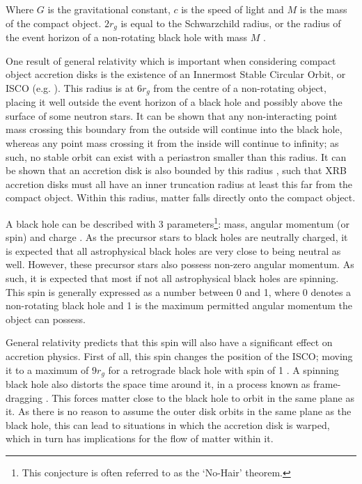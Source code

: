 Where $G$ is the gravitational constant, $c$ is the speed of light and $M$ is the mass of the compact object.  $2r_g$ is equal to the Schwarzchild radius, or the radius of the event horizon of a non-rotating black hole with mass $M$ \citep{Schwarzschild}.
\par One result of general relativity which is important when considering compact object accretion disks is the existence of an Innermost Stable Circular Orbit, or ISCO (e.g. \citealp{Misner_GravBook}).  This radius is at $6r_g$ from the centre of a non-rotating object, placing it well outside the event horizon of a black hole and possibly above the surface of some neutron stars.  It can be shown that any non-interacting point mass crossing this boundary from the outside will continue into the black hole, whereas any point mass crossing it from the inside will continue to infinity; as such, no stable orbit can exist with a periastron smaller than this radius. It can be shown that an accretion disk is also bounded by this radius \citep{Kozlowski_ISCO}, such that XRB accretion disks must all have an inner truncation radius at least this far from the compact object.  Within this radius, matter falls directly onto the compact object.
\par A black hole can be described with 3 parameters\footnote{This conjecture is often referred to as the `No-Hair' theorem.}: mass, angular momentum (or spin) and charge \citep{Israel_Bald}.  As the precursor stars to black holes are neutrally charged, it is expected that all astrophysical black holes are very close to being neutral as well.  However, these precursor stars also possess non-zero angular momentum.  As such, it is expected that most if not all astrophysical black holes are spinning.  This spin is generally expressed as a number between 0 and 1, where 0 denotes a non-rotating black hole and 1 is the maximum permitted angular momentum the object can possess.
\par General relativity predicts that this spin will also have a significant effect on accretion physics.  First of all, this spin changes the position of the ISCO; moving it to a maximum of $9r_g$ for a retrograde black hole with spin of 1 \citep{Kerr_BH}.  A spinning black hole also distorts the space time around it, in a process known as frame-dragging \citep{Lense_Thirring}.  This forces matter close to the black hole to orbit in the same plane as it.  As there is no reason to assume the outer disk orbits in the same plane as the black hole, this can lead to situations in which the accretion disk is warped, which in turn has implications for the flow of matter within it.
